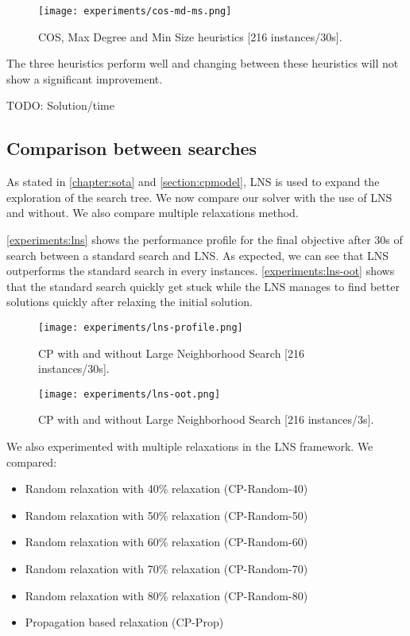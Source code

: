 \documentclass[../../thesis.tex]{subfiles}
\begin{document}
\begin{figure}
  \centering
  \texttt{[image: experiments/cos-md-ms.png]}
  \caption{COS, Max Degree and Min Size heuristics [216 instances/30s].}
  \label{experiments:heuristics:3}
\end{figure}

The three heuristics perform well and changing between these heuristics will not show a significant improvement.

TODO: Solution/time

\subsection{Comparison between searches}


As stated in \autoref{chapter:sota} and \autoref{section:cpmodel}, LNS is used to expand the exploration
of the search tree. We now compare our solver with the use of LNS and without. We also compare multiple 
relaxations method.


\autoref{experiments:lns} shows the performance profile for the final objective after 30s of search 
between a standard search and LNS. As expected, we can see that LNS outperforms the standard search 
in every instances. \autoref{experiments:lns-oot} shows that the standard search quickly get stuck
while the LNS manages to find better solutions quickly after relaxing the initial solution.


\begin{figure}
  \centering
  \texttt{[image: experiments/lns-profile.png]}
  \caption{CP with and without Large Neighborhood Search [216 instances/30s].}
  \label{experiments:lns}
\end{figure}

\begin{figure}
  \centering
  \texttt{[image: experiments/lns-oot.png]}
  \caption{CP with and without Large Neighborhood Search [216 instances/3s].}
  \label{experiments:lns-oot}
\end{figure}



We also experimented with multiple relaxations in the LNS framework. We compared:

\begin{itemize}
  \item Random relaxation with 40\% relaxation (CP-Random-40)
  \item Random relaxation with 50\% relaxation (CP-Random-50)
  \item Random relaxation with 60\% relaxation (CP-Random-60)
  \item Random relaxation with 70\% relaxation (CP-Random-70)
  \item Random relaxation with 80\% relaxation (CP-Random-80)
  \item Propagation based relaxation (CP-Prop)
\end{itemize}
\end{document}
